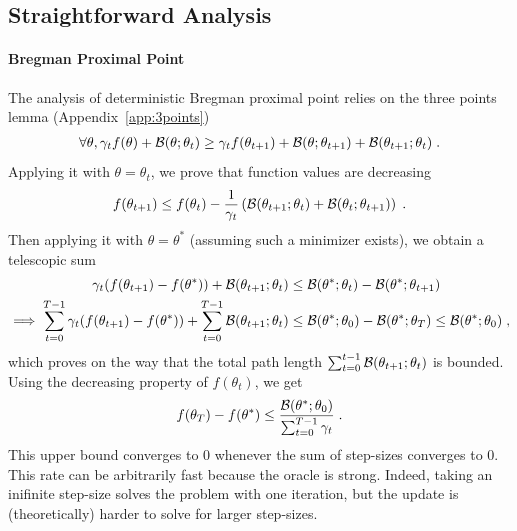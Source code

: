 \documentclass{article}
\newcommand{\natp}{\theta}
\newcommand{\lr}{\gamma} %
\begin{document}
\subsection{Straightforward Analysis}

\paragraph{Bregman Proximal Point}
The analysis of deterministic Bregman proximal \citep{chen1993convergence} point relies on the three points lemma (Appendix~\ref{app:3points})
\begin{align}
	 \forall \natp, \lr_t f(\natp) + \cB(\natp ; \natp_t) \geq \lr_t f(\natp_{t+1}) + \cB( \natp; \natp_{t+1}) +\cB(\natp_{t+1} ; \natp_{t}) \; .
\end{align}
Applying it with $\natp=\natp_t$, we prove that function values are decreasing
\begin{align}
	f(\natp_{t+1})  \leq f(\natp_{t})  - \inv{\lr_t}\left (\cB(\natp_{t+1} ; \natp_{t}) + \cB(\natp_{t} ; \natp_{t+1}) \right) \; .
\end{align}
Then applying it with $\natp=\natp^*$ (assuming such a minimizer exists), we obtain a telescopic sum
\begin{align}
	\lr_t(f(\natp_{t+1}) - f(\natp^*)) +  \cB(\natp_{t+1} ; \natp_{t}) 
	&\leq  \cB( \natp^*; \natp_{t})  - \cB( \natp^*; \natp_{t+1}) \\
	\implies \sum_{t=0}^{T-1} \lr_t (f(\natp_{t+1}) - f(\natp^*)) 
	+ \sum_{t=0}^{T-1} \cB(\natp_{t+1} ; \natp_{t}) 
	&\leq \cB( \natp^*; \natp_{0})  - \cB( \natp^*; \natp_{T})  
	\leq \cB( \natp^*; \natp_{0})  \; ,
\end{align}
which proves on the way that the total path length $ \sum_{t=0}^{t-1} \cB(\natp_{t+1} ; \natp_{t}) $ is bounded.
Using the decreasing property of $f(\natp_t)$, we get
\begin{align}
	f(\natp_{T}) - f(\natp^*) \leq \frac{\cB( \natp^*; \natp_{0}) }{\sum_{t=0}^{T-1} \lr_t} \; .
\end{align}
This upper bound converges to $0$ whenever the sum of step-sizes converges to $0$. 
This rate can be arbitrarily fast because the oracle is strong. Indeed, taking an inifinite step-size solves the problem with one iteration, but the update is (theoretically) harder to solve for larger step-sizes.
\end{document}
